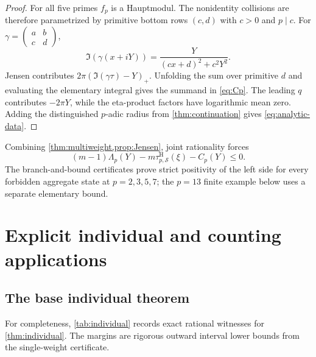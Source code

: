 \documentclass[11pt]{article}
\theoremstyle{definition}
\theoremstyle{remark}
\begin{document}
\begin{proof}
For all five primes $f_p$ is a Hauptmodul.  The nonidentity collisions are
therefore parametrized by primitive bottom rows $(c,d)$ with $c>0$ and
$p\mid c$.  For
$\gamma=\left(\begin{smallmatrix}a&b\\c&d\end{smallmatrix}\right)$,
\[
 \Im(\gamma(x+iY))=\frac{Y}{(cx+d)^2+c^2Y^2}.
\]
Jensen contributes $2\pi(\Im(\gamma\tau)-Y)_+$.  Unfolding the sum over
primitive $d$ and evaluating the elementary integral gives the summand in
\eqref{eq:Cp}.  The leading $q$ contributes $-2\pi Y$, while the eta-product
factors have logarithmic mean zero.  Adding the distinguished $p$-adic radius
from \cref{thm:continuation} gives \eqref{eq:analytic-data}.
\end{proof}

Combining \cref{thm:multiweight,prop:Jensen}, joint rationality forces
\begin{equation}\label{eq:margin}
 (m-1)\Lambda_p(Y)-m\tau^{\mathrm H}_{p,\mathcal S}(\xi)-C_p(Y)\le0.
\end{equation}
The branch-and-bound certificates prove strict positivity of the left side
for every forbidden aggregate state at $p=2,3,5,7$; the $p=13$ finite example
below uses a separate elementary bound.

\section{Explicit individual and counting applications}\label{sec:applications}

\subsection{The base individual theorem}

For completeness, \cref{tab:individual} records exact rational witnesses for
\cref{thm:individual}.  The margins are rigorous outward interval lower
bounds from the single-weight certificate.
\end{document}
